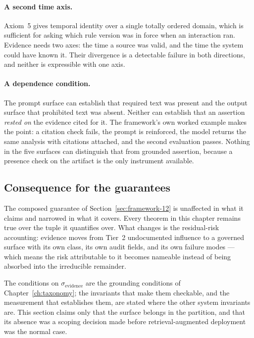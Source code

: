 \paragraph{A second time axis.} Axiom~5 gives temporal identity over a single totally
ordered domain, which is sufficient for asking which rule version was in force when an
interaction ran. Evidence needs two axes: the time a source was valid, and the time the
system could have known it. Their divergence is a detectable failure in both
directions, and neither is expressible with one axis.

\paragraph{A dependence condition.} The prompt surface can establish that required text
was present and the output surface that prohibited text was absent. Neither can establish
that an assertion \emph{rested on} the evidence cited for it. The framework's own worked
example makes the point: a citation check fails, the prompt is reinforced, the model
returns the same analysis with citations attached, and the second evaluation passes.
Nothing in the five surfaces can distinguish that from grounded assertion, because a
presence check on the artifact is the only instrument available.

\subsection{Consequence for the guarantees}

The composed guarantee of Section~\ref{sec:framework-12} is unaffected in what it claims and
narrowed in what it covers. Every theorem in this chapter remains true over the tuple it
quantifies over. What changes is the residual-risk accounting: evidence moves from Tier~2
undocumented influence to a governed surface with its own class, its own audit fields, and
its own failure modes --- which means the risk attributable to it becomes nameable
instead of being absorbed into the irreducible remainder.

The conditions on $\sigma_{\mathrm{evidence}}$ are the grounding conditions of
Chapter~\ref{ch:taxonomy}; the invariants that make them checkable, and the
measurement that establishes them, are stated where the other system invariants are. This section
claims only that the surface belongs in the partition, and that its absence was a
scoping decision made before retrieval-augmented deployment was the normal case.

